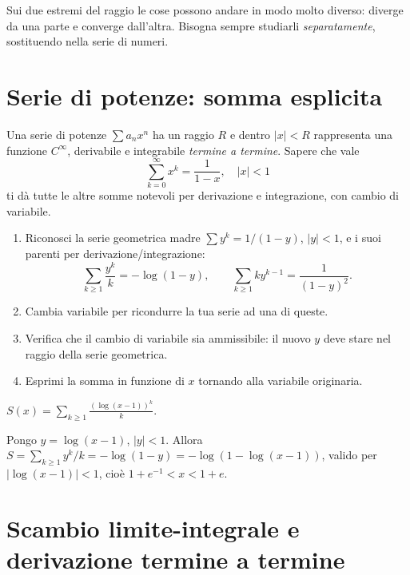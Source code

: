 \documentclass[11pt,a4paper,openany]{book}
\theoremstyle{plain}
\theoremstyle{definition}
\theoremstyle{remark}
\begin{document}
\begin{trappola}
Sui due estremi del raggio le cose possono andare in modo molto diverso:
diverge da una parte e converge dall'altra. Bisogna sempre studiarli
\emph{separatamente}, sostituendo nella serie di numeri.
\end{trappola}

\section{Serie di potenze: somma esplicita}

\begin{nota}[title={Intuizione}]
Una serie di potenze $\sum a_n x^n$ ha un raggio $R$ e dentro
$|x|<R$ rappresenta una funzione $C^\infty$, derivabile e integrabile
\emph{termine a termine}. Sapere che vale
\[
\sum_{k=0}^\infty x^k=\frac{1}{1-x},\quad |x|<1
\]
ti d\`a tutte le altre somme notevoli per derivazione e integrazione,
con cambio di variabile.
\end{nota}

\begin{ricetta}[title={Calcolare la somma di una serie}]
\begin{enumerate}
\item Riconosci la serie geometrica madre $\sum y^k=1/(1-y)$,
   $|y|<1$, e i suoi parenti per derivazione/integrazione:
   \[
   \sum_{k\ge 1}\frac{y^k}{k}=-\log(1-y),\qquad
   \sum_{k\ge 1} k y^{k-1}=\frac{1}{(1-y)^2}.
   \]
\item Cambia variabile per ricondurre la tua serie ad una di queste.
\item Verifica che il cambio di variabile sia ammissibile: il nuovo $y$
   deve stare nel raggio della serie geometrica.
\item Esprimi la somma in funzione di $x$ tornando alla variabile
   originaria.
\end{enumerate}
\end{ricetta}

\begin{esempio}[title={Tipo Sapienza --- 6/7/2022}]
$\displaystyle S(x)=\sum_{k\ge 1}\frac{(\log(x-1))^k}{k}$.

Pongo $y=\log(x-1)$, $|y|<1$. Allora
$S=\sum_{k\ge 1}y^k/k=-\log(1-y)=-\log(1-\log(x-1))$,
valido per $|\log(x-1)|<1$, cio\`e $1+e^{-1}<x<1+e$.
\end{esempio}

\section{Scambio limite-integrale e derivazione termine a termine}
\end{document}
